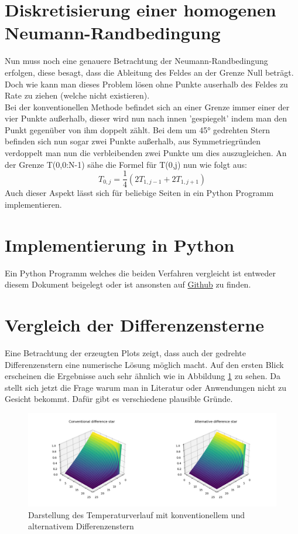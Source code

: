 \documentclass[twoside,10pt,a4paper]{article}
\numberwithin{equation}{section}					%
\numberwithin{figure}{section}						%
\begin{document}
\section{Diskretisierung einer homogenen Neumann-Randbedingung}
Nun muss noch eine genauere Betrachtung der Neumann-Randbedingung erfolgen, diese besagt, dass die Ableitung des Feldes an der Grenze Null beträgt. Doch wie kann man dieses Problem lösen ohne Punkte auserhalb des Feldes zu Rate zu ziehen (welche nicht existieren).\\
Bei der konventionellen Methode befindet sich an einer Grenze immer einer der vier Punkte außerhalb, dieser wird nun nach innen 'gespiegelt' indem man den Punkt gegenüber von ihm doppelt zählt.
Bei dem um 45° gedrehten Stern befinden sich nun sogar zwei Punkte außerhalb, aus Symmetriegründen verdoppelt man nun die verbleibenden zwei Punkte um dies auszugleichen.
An der Grenze T(0,0:N-1) sähe die Formel für T(0,j) nun wie folgt aus:\\
\begin{equation}
    T_{0,j}=\frac{1}{4}(2T_{1,j-1}+2T_{1,j+1})
\end{equation}
Auch dieser Aspekt lässt sich für beliebige Seiten in ein Python Programm implementieren.

\section{Implementierung in Python}
Ein Python Programm welches die beiden Verfahren vergleicht ist entweder diesem Dokument beigelegt oder ist ansonsten auf \href{https://github.com/FReinwald/Heat-transfer-with-alternative-difference-star}{Github} zu finden.

\section{Vergleich der Differenzensterne}
Eine Betrachtung der erzeugten Plots zeigt, dass auch der gedrehte Differenzenstern eine numerische Lösung möglich macht. Auf den ersten Blick erscheinen die Ergebnisse auch sehr ähnlich wie in Abbildung \ref{fig:compare} zu sehen. Da stellt sich jetzt die Frage warum man in Literatur oder Anwendungen nicht zu Gesicht bekommt. Dafür gibt es verschiedene plausible Gründe.
\begin{figure}[h]
        \centering
        \includegraphics[width=\textwidth]{bilder/convalt.jpg}
        \caption{Darstellung des Temperaturverlauf mit konventionellem und alternativem Differenzenstern}
        \label{fig:compare}
    \end{figure}
\end{document}
